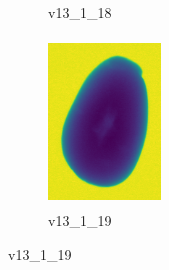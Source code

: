 \documentclass[11pt]{article}
\begin{document}
\begin{figure}
\begin{subfigure}[b]{0.15\textwidth}
        \caption{v13\_1\_18}
         \label{fig:five over x}
     \end{subfigure}
     \hfill
    \begin{subfigure}[b]{0.15\textwidth}
         \centering
         \includegraphics[width=3cm, height=4.5cm]{images/kartofler/v13_1_19_cut.png}
        \caption{v13\_1\_19}
         \label{fig:five over x}
     \end{subfigure}
\end{figure}








\newpage
\end{document}
